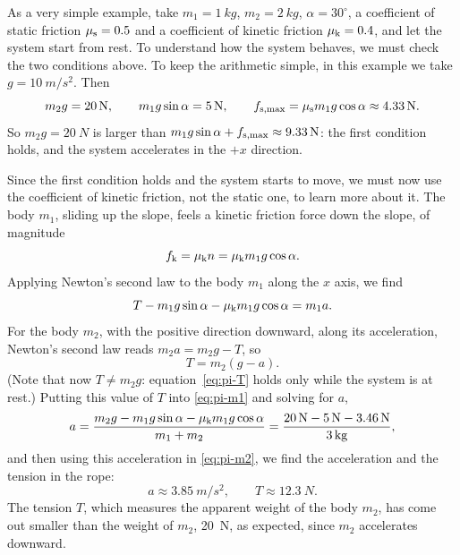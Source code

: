 \documentclass[11pt,a4paper]{article}
\begin{document}
\begin{example}
\setlength{\parskip}{0.5em plus 0.1em}%
As a very simple example, take $m_1 = \qty{1}{kg}$, $m_2 = \qty{2}{kg}$, $\alpha = 30^\circ$, a
coefficient of static friction $\mu_{\mathrm{s}} = 0.5$ and a coefficient of kinetic friction
$\mu_{\mathrm{k}} = 0.4$, and let the system start from rest. To understand how the system behaves, we must
check the two conditions above. To keep the arithmetic simple, in this example we take
$g = \qty{10}{m/s^2}$. Then
\begin{equation}\label{eq:pi-num}
  m_2 g = \qty{20}{N} , \qquad m_1 g\sin\alpha = \qty{5}{N} , \qquad
  f_{\mathrm{s,max}} = \mu_{\mathrm{s}} m_1 g\cos\alpha \approx \qty{4.33}{N} .
\end{equation}
So $m_2 g = \qty{20}{N}$ is larger than $m_1 g\sin\alpha + f_{\mathrm{s,max}} \approx \qty{9.33}{N}$: the first
condition holds, and the system accelerates in the $+x$ direction.

Since the first condition holds and the system starts to move, we must now use the coefficient of
kinetic friction, not the static one, to learn more about it. The body $m_1$, sliding up the slope,
feels a kinetic friction force down the slope, of magnitude
\begin{equation}\label{eq:pi-fk}
  f_{\mathrm{k}} = \mu_{\mathrm{k}} n = \mu_{\mathrm{k}} m_1 g\cos\alpha .
\end{equation}
Applying Newton's second law to the body $m_1$ along the $x$ axis, we find
\begin{equation}\label{eq:pi-m1}
  T - m_1 g\sin\alpha - \mu_{\mathrm{k}} m_1 g\cos\alpha = m_1 a .
\end{equation}
For the body $m_2$, with the positive direction downward, along its acceleration, Newton's second law
reads $m_2 a = m_2 g - T$, so
\begin{equation}\label{eq:pi-m2}
  T = m_2 (g - a) .
\end{equation}
(Note that now $T \neq m_2 g$: equation~\eqref{eq:pi-T} holds only while the system is at rest.)
Putting this value of $T$ into \eqref{eq:pi-m1} and solving for $a$,
\[
  a = \frac{m_2 g - m_1 g\sin\alpha - \mu_{\mathrm{k}} m_1 g\cos\alpha}{m_1 + m_2}
    = \frac{\qty{20}{N} - \qty{5}{N} - \qty{3.46}{N}}{\qty{3}{kg}} ,
\]
and then using this acceleration in \eqref{eq:pi-m2}, we find the acceleration and the tension in the
rope:
\begin{equation}\label{eq:pi-aT}
  a \approx \qty{3.85}{m/s^2} , \qquad T \approx \qty{12.3}{N} .
\end{equation}
The tension $T$, which measures the apparent weight of the body $m_2$, has come out smaller than the
weight of $m_2$, \qty{20}{N}, as expected, since $m_2$ accelerates downward.


\end{example}
\end{document}
